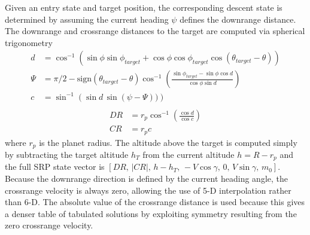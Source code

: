 \documentclass[letterpaper, preprint, paper,11pt]{AAS}
\begin{document}
Given an entry state and target position, the corresponding descent state is determined by assuming the current heading $\psi$ defines the downrange distance. The downrange and crossrange distances to the target are computed via spherical trigonometry \cite{joel_dissertation}
\begin{align}
d &= \cos^{-1}\left(\sin\phi\sin\phi_{target} +\cos\phi\cos\phi_{target}\cos(\theta_{target}-\theta)        \right) \\
\Psi &= \pi/2 - \mathrm{sign}(\theta_{target}-\theta) \cos^{-1}\left(\frac{\sin\phi_{target}-\sin\phi\cos d}{\cos\phi\sin d}  \right) \\
c &= \sin^{-1}\left(\sin d\,\sin(\psi-\Psi))\right) \\
\end{align}
\begin{align}
DR &= r_p\cos^{-1}\left(\frac{\cos d}{\cos c}\right)\\
CR &= r_pc
\end{align}
where $r_p$ is the planet radius. The altitude above the target is computed simply by subtracting the target altitude $h_T$ from the current altitude $h = R-r_p$ and the full SRP state vector is $[DR,\, |CR|,\, h-h_T,\, -V\cos\gamma,\, 0,\, V\sin\gamma,\, m_0]$. Because the downrange direction is defined by the current heading angle, the crossrange velocity is always zero, allowing the use of 5-D interpolation rather than 6-D. The absolute value of the crossrange distance is used because this gives a denser table of tabulated solutions by exploiting symmetry resulting from the zero crossrange velocity. 
\end{document}
